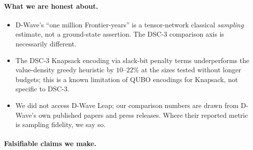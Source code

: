 \documentclass[11pt,a4paper]{article}
\begin{document}
\paragraph{What we are honest about.}
\begin{itemize}\itemsep0.2em
\item[$\bullet$] D-Wave's ``one million Frontier-years'' is a tensor-network
  classical \emph{sampling} estimate, not a ground-state assertion. The
  DSC-3 comparison axis is necessarily different.
\item[$\bullet$] The DSC-3 Knapsack encoding via slack-bit penalty terms
  underperforms the value-density greedy heuristic by $10$--$22\%$ at the
  sizes tested without longer budgets; this is a known limitation of QUBO
  encodings for Knapsack, not specific to DSC-3.
\item[$\bullet$] We did not access D-Wave Leap; our comparison numbers are
  drawn from D-Wave's own published papers and press releases. Where their
  reported metric is sampling fidelity, we say so.
\end{itemize}

\paragraph{Falsifiable claims we make.}\
\end{document}
